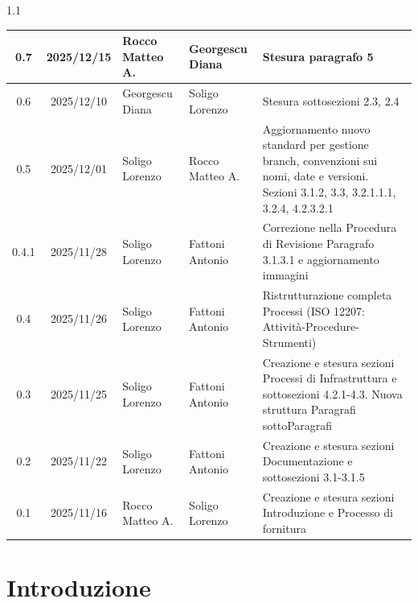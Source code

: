 \documentclass[a4paper,12pt]{article}
\begin{document}
\begin{spacing}{1.1}
\begin{longtable}{|c|c|p{3.2cm}|p{3.2cm}|p{5cm}|}
        \hline
        0.7               & 2025/12/15    & Rocco Matteo A.  & Georgescu Diana       & Stesura paragrafo 5                                                                                                                      \\
        \hline
        0.6               & 2025/12/10    & Georgescu Diana  & Soligo Lorenzo        & Stesura sottosezioni 2.3, 2.4                                                                                                            \\
        \hline
        0.5               & 2025/12/01    & Soligo Lorenzo   & Rocco Matteo A.       & Aggiornamento nuovo standard per gestione branch, convenzioni sui nomi, date e versioni. Sezioni 3.1.2, 3.3, 3.2.1.1.1, 3.2.4, 4.2.3.2.1 \\
        \hline
        0.4.1             & 2025/11/28    & Soligo Lorenzo   & Fattoni Antonio       & Correzione nella Procedura di Revisione Paragrafo 3.1.3.1 e aggiornamento immagini                                                       \\
        \hline
        0.4               & 2025/11/26    & Soligo Lorenzo   & Fattoni Antonio       & Ristrutturazione completa Processi (ISO 12207: Attività-Procedure-Strumenti)                                                             \\
        \hline
        0.3               & 2025/11/25    & Soligo Lorenzo   & Fattoni Antonio       & Creazione e stesura sezioni Processi di Infrastruttura e sottosezioni 4.2.1-4.3. Nuova struttura Paragrafi sottoParagrafi                \\
        \hline
        0.2               & 2025/11/22    & Soligo Lorenzo   & Fattoni Antonio       & Creazione e stesura sezioni Documentazione e sottosezioni 3.1-3.1.5                                                                      \\
        \hline
        0.1               & 2025/11/16    & Rocco Matteo A.  & Soligo Lorenzo        & Creazione e stesura sezioni Introduzione e Processo di fornitura                                                                         \\
        \hline
    \end{longtable}
\end{spacing}
\newpage

\tableofcontents
\listoffigures

\section{Introduzione}
\end{document}
